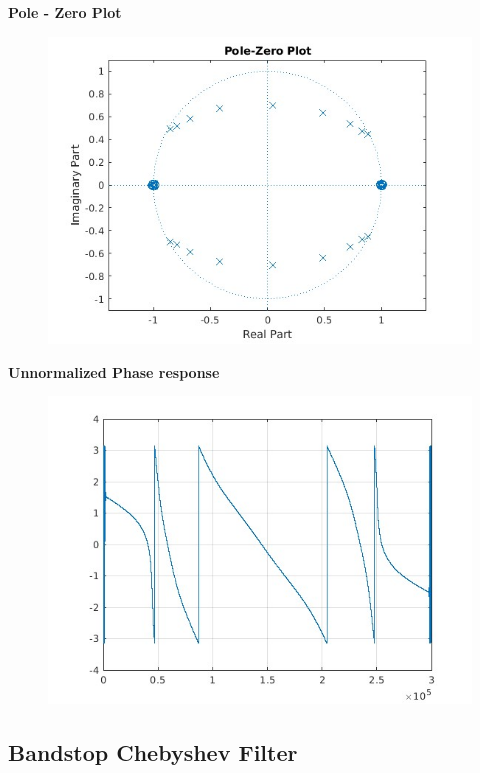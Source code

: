 \documentclass{article}
\begin{document}
\textbf{Pole - Zero Plot}
\begin{figure}[H]
\hspace*{-2.5cm}
    \centering
    \includegraphics[scale = 0.5]{polezero_bpf.jpg}
    \label{fig:my_label}
\end{figure}


\textbf{Unnormalized Phase response}
\begin{figure}[H]
\hspace*{-2.5cm}
    \centering
    \includegraphics[scale = 0.5]{bpf_cheby_phase.jpg}
    \label{fig:my_label}
\end{figure}

\subsection{\textbf{Bandstop Chebyshev Filter}}
\end{document}
